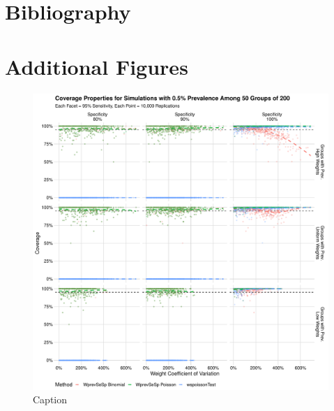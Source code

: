 \documentclass[AMA,STIX1COL]{WileyNJD-v2}
\begin{document}
\section{Bibliography}
\nocite{*}%
%

\appendix
\section{Additional Figures}

\begin{figure}
\centering
\includegraphics[width=\textwidth]{figures/imperfect_coverage_50_groups_0_005_prev.pdf}
\caption{Caption}
\label{fig:imperfect_coverage_50_groups_0_005_prev}
\end{figure}
\end{document}
